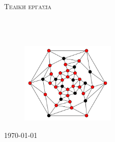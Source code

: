 \documentclass[
11pt, %
oneside, %
greek, %
singlespacing, %
headsepline, %
]{MastersDoctoralThesis} %
\author{Δημήτριος \textsc{Δήμου}} %
\begin{document}
\frontmatter %

\pagestyle{plain} %


\begin{titlepage}
\begin{center}

{\scshape\LARGE \univname\par}\vspace{0.5cm} %
{\scshape\Large \deptname\par}\vspace{1.5cm}
\textsc{\Large Τελική εργασία}\\[0.5cm] %

\HRule \\[0.4cm] %
{\huge \bfseries \ttitle\par}\vspace{0.4cm} %
\HRule \\[1.5cm] %
 
\begin{figure}[H]
\centering
\includegraphics[width=0.4\textwidth]{Figures/vertexcover.png}
\end{figure}

\vfill
\begin{minipage}[t]{0.7\textwidth}
\begin{flushleft} \large
\centerline{\authorname}%
\end{flushleft}
\end{minipage}

{\large \today}\vspace{-10mm} %
 

\end{center}
\end{titlepage}
\end{document}
